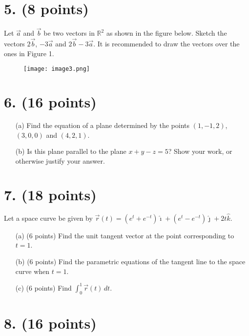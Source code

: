 \newpage

\section*{5. (8 points)}

Let $\vec{a}$ and $\vec{b}$ be two vectors in $\mathbb{R}^2$ as shown in the figure below. Sketch the vectors $2\vec{b}$, $-3\vec{a}$ and $2\vec{b} - 3\vec{a}$. It is recommended to draw the vectors over the ones in Figure 1.

\begin{figure}[ht!]
        \centering
        \texttt{[image: image3.png]}
    \end{figure}

\newpage

\section*{6. (16 points)}

\begin{itemize}
    \item[(a)] Find the equation of a plane determined by the points $(1, -1, 2)$, $(3, 0, 0)$ and $(4, 2, 1)$.
    \item[(b)] Is this plane parallel to the plane $x + y - z = 5$? Show your work, or otherwise justify your answer.
\end{itemize}

\newpage

\section*{7. (18 points)}

Let a space curve be given by $\vec{r}(t) = (e^t + e^{-t})\hat{\imath} + (e^t - e^{-t})\hat{\jmath} + 2t\hat{k}$.

\begin{itemize}
    \item[(a)] (6 points) Find the unit tangent vector at the point corresponding to $t = 1$.
    \item[(b)] (6 points) Find the parametric equations of the tangent line to the space curve when $t = 1$.
    \item[(c)] (6 points) Find $\displaystyle \int_0^1 \vec{r}(t)\, dt$.
\end{itemize}

\newpage

\section*{8. (16 points)}

